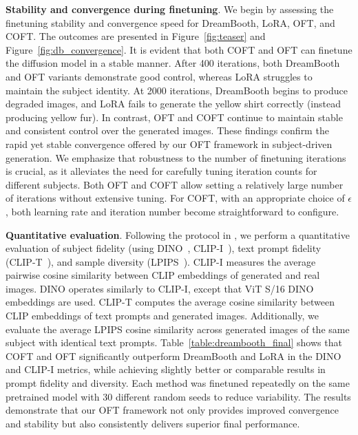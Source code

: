 \textbf{Stability and convergence during finetuning}. We begin by assessing the finetuning stability and convergence speed for DreamBooth, LoRA, OFT, and COFT. The outcomes are presented in Figure~\ref{fig:teaser} and Figure~\ref{fig:db_convergence}. It is evident that both COFT and OFT can finetune the diffusion model in a stable manner. After 400 iterations, both DreamBooth and OFT variants demonstrate good control, whereas LoRA struggles to maintain the subject identity. At 2000 iterations, DreamBooth begins to produce degraded images, and LoRA fails to generate the yellow shirt correctly (instead producing yellow fur). In contrast, OFT and COFT continue to maintain stable and consistent control over the generated images. These findings confirm the rapid yet stable convergence offered by our OFT framework in subject-driven generation. We emphasize that robustness to the number of finetuning iterations is crucial, as it alleviates the need for carefully tuning iteration counts for different subjects. Both OFT and COFT allow setting a relatively large number of iterations without extensive tuning. For COFT, with an appropriate choice of $\epsilon$, both learning rate and iteration number become straightforward to configure.

\textbf{Quantitative evaluation}. Following the protocol in \cite{ruiz2023dreambooth}, we perform a quantitative evaluation of subject fidelity (using DINO~\cite{caron2021emerging}, CLIP-I~\cite{radford2021learning}), text prompt fidelity (CLIP-T~\cite{radford2021learning}), and sample diversity (LPIPS~\cite{zhang2018unreasonable}). CLIP-I measures the average pairwise cosine similarity between CLIP embeddings of generated and real images. DINO operates similarly to CLIP-I, except that ViT S/16 DINO embeddings are used. CLIP-T computes the average cosine similarity between CLIP embeddings of text prompts and generated images. Additionally, we evaluate the average LPIPS cosine similarity across generated images of the same subject with identical text prompts. Table~\ref{table:dreambooth_final} shows that COFT and OFT significantly outperform DreamBooth and LoRA in the DINO and CLIP-I metrics, while achieving slightly better or comparable results in prompt fidelity and diversity. Each method was finetuned repeatedly on the same pretrained model with 30 different random seeds to reduce variability. The results demonstrate that our OFT framework not only provides improved convergence and stability but also consistently delivers superior final performance.

